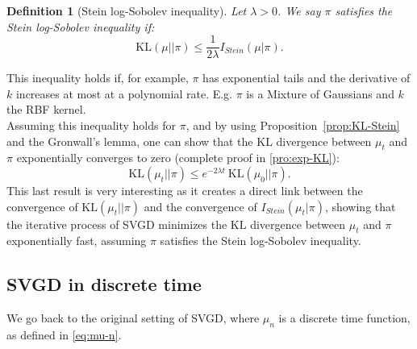 \documentclass{article}
\newcommand{\KL}{\mathrm{KL}}
\newcommand{\Stein}{I_{Stein}(\mu | \pi)}
\newtheorem{definition}{Definition}
\begin{document}
\begin{definition}[Stein log-Sobolev inequality]\label{def:stein-log-Sobolev}
  Let $\lambda > 0$. We say $\pi$ satisfies the Stein log-Sobolev inequality if:
  $$
  \KL(\mu || \pi) \leq \frac{1}{2 \lambda} \Stein.
  $$
\end{definition}
\noindent
This inequality holds if, for example, $\pi$ has exponential tails and the derivative of $k$
increases at most at a polynomial rate. E.g. $\pi$ is a Mixture of Gaussians
and $k$ the RBF kernel.\\
Assuming this inequality holds for $\pi$, and by using Proposition~\ref{prop:KL-Stein}
and the Gronwall's lemma,
one can show that the $\KL$ divergence between $\mu_t$ and $\pi$ exponentially
converges to zero (complete proof in \ref{pro:exp-KL}):
\begin{equation}
  \KL(\mu_t || \pi) \leq e^{-2 \lambda t} \: \KL(\mu_0 || \pi).
  \label{eq:exp-KL}
\end{equation}
This last result is very interesting as it creates a direct link between the
convergence of $\KL(\mu_t || \pi)$ and the convergence
of $I_{Stein}(\mu_t | \pi)$, showing that the iterative process
of SVGD minimizes the $\KL$ divergence between $\mu_t$ and $\pi$ exponentially fast,
assuming $\pi$ satisfies the Stein log-Sobolev inequality.

\subsection{SVGD in discrete time}
We go back to the original setting of SVGD, where $\mu_n$ is a discrete
time function, as defined in \eqref{eq:mu-n}.\\
\end{document}
